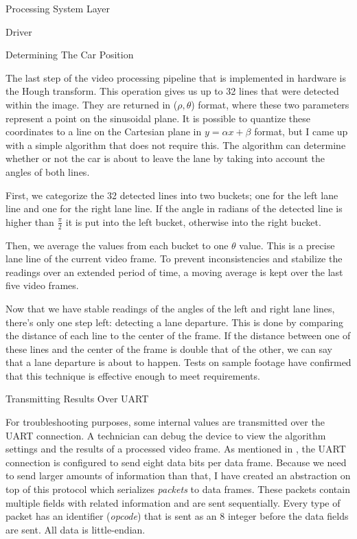\documentclass{matthijs}
\begin{document}
\begin{hoofdstuk}{Processing System Layer}
\begin{paragraaf}{Driver}
		\end{paragraaf}

		\begin{paragraaf}{Determining The Car Position}

			The last step of the video processing pipeline that is implemented in hardware is the Hough transform.
			This operation gives us up to 32 lines that were detected within the image.
			They are returned in ($ \rho , \theta $) format, where these two parameters represent a point on the sinusoidal plane.
			It is possible to quantize these coordinates to a line on the Cartesian plane in $y = \alpha x + \beta$ format, but I came up with a simple algorithm that does not require this.
			The algorithm can determine whether or not the car is about to leave the lane by taking into account the angles of both lines.

			\bigskip

			First, we categorize the 32 detected lines into two buckets; one for the left lane line and one for the right lane line.
			If the angle in radians of the detected line is higher than $\frac{\pi}{2}$ it is put into the left bucket, otherwise into the right bucket.

			\bigskip

			Then, we average the values from each bucket to one $\theta$ value.
			This is a precise lane line of the current video frame.
			To prevent inconsistencies and stabilize the readings over an extended period of time, a moving average is kept over the last five video frames.

			\bigskip

			Now that we have stable readings of the angles of the left and right lane lines, there's only one step left: detecting a lane departure.
			This is done by comparing the distance of each line to the center of the frame.
			If the distance between one of these lines and the center of the frame is double that of the other, we can say that a lane departure is about to happen.
			Tests on sample footage have confirmed that this technique is effective enough to meet requirements.

		\end{paragraaf}

		\begin{paragraaf}{Transmitting Results Over UART}

			For troubleshooting purposes, some internal values are transmitted over the UART connection.
			A technician can debug the device to view the algorithm settings and the results of a processed video frame.
			As mentioned in , the UART connection is configured to send eight data bits per data frame.
			Because we need to send larger amounts of information than that, I have created an abstraction on top of this protocol which serializes \textit{packets} to data frames.
			These packets contain multiple fields with related information and are sent sequentially.
			Every type of packet has an identifier (\textit{opcode}) that is sent as an \qty{8}{\bit} integer before the data fields are sent.
			All data is little-endian.


\end{paragraaf}
\end{hoofdstuk}
\end{document}

